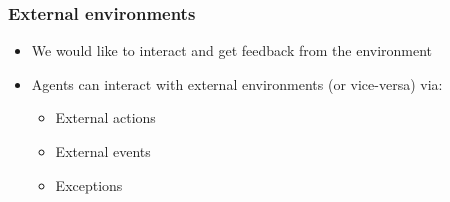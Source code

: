   
  \begin{frame}
    \frametitle{External environments}
    \begin{itemize}
      \item We would like to interact and get feedback from the environment
      \item Agents can interact with external environments (or vice-versa) via:
      \begin{itemize}
        \item External actions
        \item External events
        \item Exceptions
      \end{itemize}
    \end{itemize}
  \end{frame}